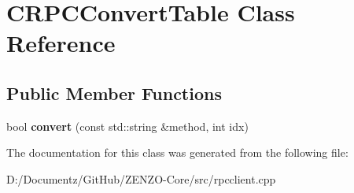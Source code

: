 \hypertarget{class_c_r_p_c_convert_table}{}\section{C\+R\+P\+C\+Convert\+Table Class Reference}
\label{class_c_r_p_c_convert_table}
\subsection*{Public Member Functions}
\begin{DoxyCompactItemize}
\item 
\mbox{\label{class_c_r_p_c_convert_table_a034b770cb03e79074111b85eba889e58}} 
bool {\bfseries convert} (const std\+::string \&method, int idx)
\end{DoxyCompactItemize}


The documentation for this class was generated from the following file\+:\begin{DoxyCompactItemize}
\item 
D\+:/\+Documentz/\+Git\+Hub/\+Z\+E\+N\+Z\+O-\/\+Core/src/rpcclient.\+cpp\end{DoxyCompactItemize}
